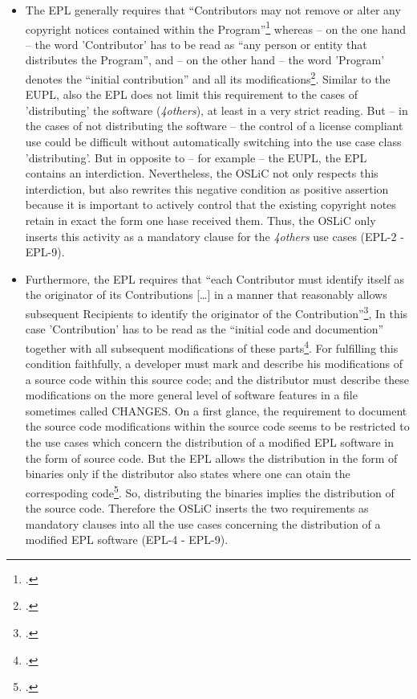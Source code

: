 \begin{itemize}

  \item The EPL generally requires that \enquote{Contributors may not remove or
  alter any copyright notices contained within the
  Program}\footcite[cf.][\nopage wp\ §3]{Epl10OsiLicense2005a} whereas -- on the
  one hand -- the word 'Contributor' has to be read as \enquote{any person or
  entity that distributes the Program}, and -- on the other hand -- the word
  'Program' denotes the \enquote{initial contribution} and all its
  modifications\footcite[cf.][\nopage wp\ §1]{Epl10OsiLicense2005a}. Similar to
  the EUPL, also the EPL does not limit this requirement to the cases of
  'distributing' the software (\emph{4others}), at least in a very strict
  reading. But -- in the cases of not distributing the software -- the control
  of a license compliant use could be difficult without automatically switching
  into the use case class 'distributing'. But in opposite to -- for example --
  the EUPL, the EPL contains an interdiction. Nevertheless, the OSLiC not only
  respects this interdiction, but also rewrites this negative condition as
  positive assertion because it is important to actively control that the
  existing copyright notes retain in exact the form one hase received them.
  Thus, the OSLiC only inserts this activity as a mandatory clause for the
  \emph{4others} use cases (EPL-2 - EPL-9).
  
  \item Furthermore, the EPL requires that \enquote{each Contributor must
  identify itself as the originator of its Contributions [\ldots] in a manner
  that reasonably allows subsequent Recipients to identify the originator of the
  Contribution}\footcite[cf.][\nopage wp\ §3]{Epl10OsiLicense2005a}, In this
  case 'Contribution' has to be read as the \enquote{initial code and
  documention} together with all subsequent modifications of these
  parts\footcite[cf.][\nopage wp\ §1]{Epl10OsiLicense2005a}. For fulfilling this
  condition faithfully, a developer must mark and describe his modifications of
  a source code within this source code; and the distributor must describe these
  modifications on the more general level of software features in a file
  sometimes called CHANGES. On a first glance, the requirement to document the
  source code modifications within the source code seems to be restricted to the
  use cases which concern the distribution of a modified EPL software in the
  form of source code. But the EPL allows the distribution in the form of
  binaries only if the distributor also states where one can otain the
  correspoding code\footcite[cf.][\nopage wp\ §3]{Epl10OsiLicense2005a}. So,
  distributing the binaries implies the distribution of the source code.
  Therefore the OSLiC inserts the two requirements as mandatory clauses into all
  the use cases concerning the distribution of a modified EPL software (EPL-4 -
  EPL-9).
  

\end{itemize}
